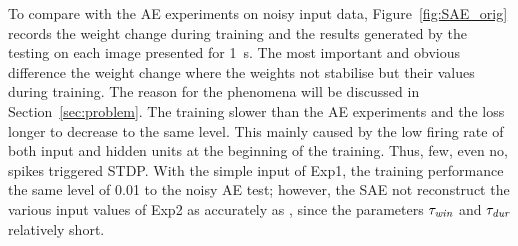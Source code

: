 To compare with the AE experiments on noisy input data, Figure~\ref{fig:SAE_orig} records the weight change during training and the results generated by the testing on each image presented for 1~s.
The most important and obvious difference \DIFdelbegin {}\DIFdelend \DIFaddbegin {}\DIFaddend the weight change where the weights \DIFdelbegin {}\DIFdelend \DIFaddbegin {}\DIFaddend not stabilise but their values \DIFdelbegin {}\DIFdelend \DIFaddbegin {}\DIFaddend during training.
The reason for the phenomena will be discussed in Section~\ref{sec:problem}.
The training \DIFdelbegin {}\DIFdelend \DIFaddbegin {}\DIFaddend slower than the AE experiments and the loss \DIFdelbegin {}\DIFdelend \DIFaddbegin {}\DIFaddend longer to decrease to the same level.
This \DIFdelbegin {}\DIFdelend \DIFaddbegin {}\DIFaddend mainly caused by the low firing rate of both input and hidden units at the beginning of the training.
Thus, few, even no, spikes triggered STDP.
With the simple input of Exp1, the training performance \DIFdelbegin {}\DIFdelend \DIFaddbegin {}\DIFaddend the same level of 0.01 \DIFdelbegin {}\DIFdelend \DIFaddbegin {}\DIFaddend to the noisy AE test;
however, the SAE \DIFdelbegin {}\DIFdelend \DIFaddbegin {}\DIFaddend not reconstruct the various input values of Exp2 as accurately as \DIFdelbegin {}\DIFdelend \DIFaddbegin {}\DIFaddend , since the parameters $\tau_{\textit{\textrm{win}}}$ and $\tau_{\textit{\textrm{dur}}}$ \DIFdelbegin {}\DIFdelend \DIFaddbegin {}\DIFaddend relatively short.
\DIFaddbegin {}\DIFaddend 

